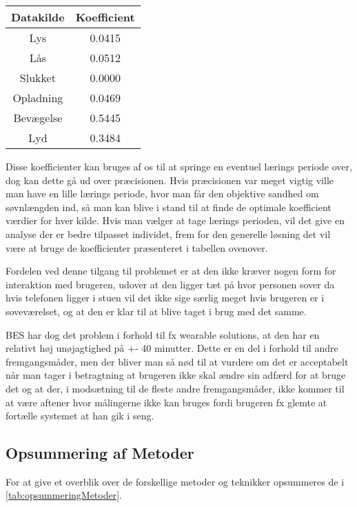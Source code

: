 \begin{tabular}{|c|c|}
\hline Datakilde & Koefficient\\
\hline Lys & 0.0415 \\ 
\hline Lås & 0.0512 \\ 
\hline Slukket & 0.0000 \\ 
\hline Opladning & 0.0469 \\ 
\hline Bevægelse & 0.5445 \\ 
\hline Lyd & 0.3484 \\ 
\hline 
\end{tabular} 

Disse koefficienter kan bruges af os til at springe en eventuel lærings periode over, dog kan dette gå ud over præcisionen.
Hvis præcisionen var meget vigtig ville man have en lille lærings periode, hvor man får den objektive sandhed om søvnlængden ind, så man kan blive i stand til at finde de optimale koefficient værdier for hver kilde. 
Hvis man vælger at tage lærings perioden, vil det give en analyse der er bedre tilpasset individet, frem for den generelle løsning det vil være at bruge de koefficienter præsenteret i tabellen ovenover.

Fordelen ved denne tilgang til problemet er at den ikke kræver nogen form for interaktion med brugeren, udover at den ligger tæt på hvor personen sover da hvis telefonen ligger i stuen vil det ikke sige særlig meget hvis brugeren er i soveværelset, og at den er klar til at blive taget i brug med det samme.

BES har dog det problem i forhold til fx wearable solutions, at den har en relativt høj unøjagtighed på +- 40 minutter. 
Dette er en del i forhold til andre fremgangsmåder, men der bliver man så nød til at vurdere om det er acceptabelt når man tager i betragtning at brugeren ikke skal ændre sin adfærd for at bruge det og at der, i modsætning til de fleste andre fremgangsmåder, ikke kommer til at være aftener hvor målingerne ikke kan bruges fordi brugeren fx glemte at fortælle systemet at han gik i seng.

\subsection{Opsummering af Metoder}
For at give et overblik over de forskellige metoder og teknikker opsummeres de i \cref{tab:opsummeringMetoder}.


